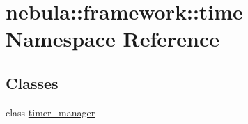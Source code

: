 \hypertarget{namespacenebula_1_1framework_1_1time}{
\section{nebula::framework::time Namespace Reference}
\label{namespacenebula_1_1framework_1_1time}
}
\subsection*{Classes}
\begin{DoxyCompactItemize}
\item 
class \hyperlink{classnebula_1_1framework_1_1time_1_1timer__manager}{timer\_\-manager}
\end{DoxyCompactItemize}

